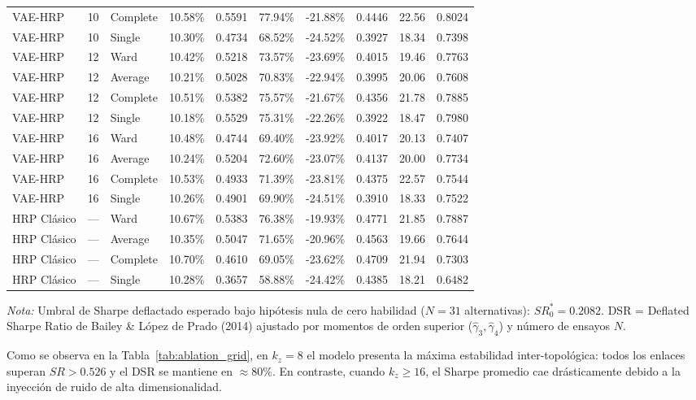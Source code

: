 \documentclass[11pt,a4paper]{article}
\begin{document}
\begin{table}[H]
{\begin{tabular}{lllccccccc}
VAE-HRP & 10 & Complete & 10.58\% & 0.5591 & 77.94\% & -21.88\% & 0.4446 & 22.56 & 0.8024 \\
VAE-HRP & 10 & Single   & 10.30\% & 0.4734 & 68.52\% & -24.52\% & 0.3927 & 18.34 & 0.7398 \\
\midrule
VAE-HRP & 12 & Ward     & 10.42\% & 0.5218 & 73.57\% & -23.69\% & 0.4015 & 19.46 & 0.7763 \\
VAE-HRP & 12 & Average  & 10.21\% & 0.5028 & 70.83\% & -22.94\% & 0.3995 & 20.06 & 0.7608 \\
VAE-HRP & 12 & Complete & 10.51\% & 0.5382 & 75.57\% & -21.67\% & 0.4356 & 21.78 & 0.7885 \\
VAE-HRP & 12 & Single   & 10.18\% & 0.5529 & 75.31\% & -22.26\% & 0.3922 & 18.47 & 0.7980 \\
\midrule
VAE-HRP & 16 & Ward     & 10.48\% & 0.4744 & 69.40\% & -23.92\% & 0.4017 & 20.13 & 0.7407 \\
VAE-HRP & 16 & Average  & 10.24\% & 0.5204 & 72.60\% & -23.07\% & 0.4137 & 20.00 & 0.7734 \\
VAE-HRP & 16 & Complete & 10.53\% & 0.4933 & 71.39\% & -23.81\% & 0.4375 & 22.57 & 0.7544 \\
VAE-HRP & 16 & Single   & 10.26\% & 0.4901 & 69.90\% & -24.51\% & 0.3910 & 18.33 & 0.7522 \\
\midrule
HRP Clásico & --- & Ward     & 10.67\% & 0.5383 & 76.38\% & -19.93\% & 0.4771 & 21.85 & 0.7887 \\
HRP Clásico & --- & Average  & 10.35\% & 0.5047 & 71.65\% & -20.96\% & 0.4563 & 19.66 & 0.7644 \\
HRP Clásico & --- & Complete & 10.70\% & 0.4610 & 69.05\% & -23.62\% & 0.4709 & 21.94 & 0.7303 \\
HRP Clásico & --- & Single   & 10.28\% & 0.3657 & 58.88\% & -24.42\% & 0.4385 & 18.21 & 0.6482 \\
\bottomrule
\end{tabular}
}
\vspace{0.15cm}
\parbox{\linewidth}{\footnotesize \textit{Nota:} Umbral de Sharpe deflactado esperado bajo hipótesis nula de cero habilidad ($N=31$ alternativas): $SR_0^* = 0.2082$. DSR = Deflated Sharpe Ratio de Bailey \& López de Prado (2014) ajustado por momentos de orden superior ($\hat{\gamma}_3, \hat{\gamma}_4$) y número de ensayos $N$.}
\end{table}

\noindent Como se observa en la Tabla~\ref{tab:ablation_grid}, en $k_z = 8$ el modelo presenta la máxima estabilidad inter-topológica: todos los enlaces superan $SR > 0.526$ y el DSR se mantiene en $\approx 80\%$. En contraste, cuando $k_z \ge 16$, el Sharpe promedio cae drásticamente debido a la inyección de ruido de alta dimensionalidad.
\end{document}
